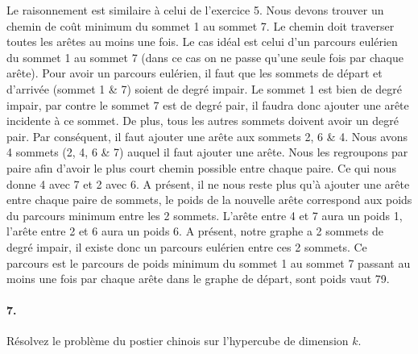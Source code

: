 \begin{solution}
Le raisonnement est similaire à celui de l'exercice 5. Nous devons
trouver un chemin de coût minimum du sommet 1 au sommet 7. Le chemin
doit traverser toutes les arêtes au moins une fois. Le cas idéal est
celui d'un parcours eulérien du sommet 1 au sommet 7 (dans ce cas
on ne passe qu'une seule fois par chaque arête). Pour avoir un parcours
eulérien, il faut que les sommets de départ et d'arrivée (sommet 1
\& 7) soient de degré impair. Le sommet 1 est bien de degré impair,
par contre le sommet 7 est de degré pair, il faudra donc ajouter une
arête incidente à ce sommet. De plus, tous les autres sommets doivent
avoir un degré pair. Par conséquent, il faut ajouter une arête aux
sommets 2, 6 \& 4. Nous avons 4 sommets (2, 4, 6 \& 7) auquel il faut
ajouter une arête. Nous les regroupons par paire afin d'avoir le plus
court chemin possible entre chaque paire. Ce qui nous donne 4 avec
7 et 2 avec 6. A présent, il ne nous reste plus qu'à ajouter une arête
entre chaque paire de sommets, le poids de la nouvelle arête correspond
aux poids du parcours minimum entre les 2 sommets. L'arête entre 4
et 7 aura un poids 1, l'arête entre 2 et 6 aura un poids 6. A présent,
notre graphe a 2 sommets de degré impair, il existe donc un parcours
eulérien entre ces 2 sommets. Ce parcours est le parcours de poids
minimum du sommet 1 au sommet 7 passant au moins une fois par chaque
arête dans le graphe de départ, sont poids vaut 79.
\end{solution}
\paragraph{7. } Résolvez le problème du postier chinois sur l'hypercube de dimension $k$.